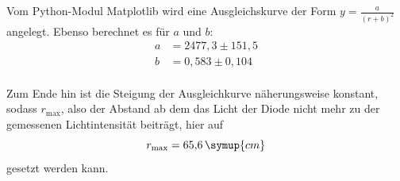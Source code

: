 \pagebreak
Vom Python-Modul Matplotlib wird eine Ausgleichskurve der Form $y = \frac{a}{(r+b)^2}$ angelegt. Ebenso berechnet es für $a$ und $b$:
\begin{equation*}
\begin{aligned}
a &= 2477{,}3 \pm 151{,}5 \\
b &= 0{,}583 \pm 0{,}104 \\
\end{aligned}
\end{equation*}

Zum Ende hin ist die Steigung der Ausgleichkurve näherungsweise konstant, sodass $r_{\text{max}}$, also der Abstand ab dem das Licht der Diode nicht mehr zu der gemessenen Lichtintensität beiträgt, hier auf
\begin{equation*}
r_{\text{max}} = 65{,}6\,\symup{cm}
\end{equation*}
gesetzt werden kann. 




